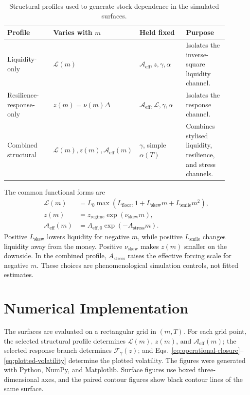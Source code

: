 \documentclass[11pt]{article}
\newcommand{\Aeff}{\mathcal A_{\mathrm{eff}}}
\newcommand{\Liq}{\mathcal L}
\newcommand{\Fresp}{\mathcal F}
\begin{document}
\begin{table}[ht]
\centering
\small
\caption{Structural profiles used to generate stock dependence in the simulated surfaces.}
\label{tab:profile-definitions}
\begin{tabular}{p{0.22\linewidth}p{0.26\linewidth}p{0.22\linewidth}p{0.20\linewidth}}
\toprule
Profile & Varies with \(m\) & Held fixed & Purpose \\
\midrule
Liquidity-only & \(\Liq(m)\) &
\(\Aeff,z,\gamma,\alpha\) &
Isolates the inverse-square liquidity channel. \\
Resilience-response-only & \(z(m)=\nu(m)\Delta\) &
\(\Aeff,\Liq,\gamma,\alpha\) &
Isolates the response channel. \\
Combined structural & \(\Liq(m),z(m),\Aeff(m)\) &
\(\gamma\), simple \(\alpha(T)\) &
Combines stylised liquidity, resilience, and stress channels. \\
\bottomrule
\end{tabular}
\end{table}

The common functional forms are
\begin{align}
 \Liq(m)
 &=
 L_0\max\!\left(L_{\mathrm{floor}},
 1+L_{\mathrm{skew}}m+L_{\mathrm{smile}}m^2\right),
 \label{eq:liquidity-profile}\\
 z(m)
 &=
 z_{\mathrm{regime}}\exp(\nu_{\mathrm{skew}}m),
 \label{eq:z-profile}\\
 \Aeff(m)
 &=
 A_{\mathrm{eff},0}\exp(-A_{\mathrm{stress}}m).
 \label{eq:forcing-profile}
\end{align}
Positive \(L_{\mathrm{skew}}\) lowers liquidity for negative \(m\), while
positive \(L_{\mathrm{smile}}\) changes liquidity away from the money.
Positive \(\nu_{\mathrm{skew}}\) makes \(z(m)\) smaller on the downside.
In the combined profile, \(A_{\mathrm{stress}}\) raises the effective forcing
scale for negative \(m\). These choices are phenomenological simulation
controls, not fitted estimates.

\section{Numerical Implementation}

The surfaces are evaluated on a rectangular grid in \((m,T)\). For each grid
point, the selected structural profile determines \(\Liq(m)\), \(z(m)\), and
\(\Aeff(m)\); the selected response branch determines \(\Fresp_\gamma(z)\);
and Eqs.~\eqref{eq:operational-closure}--\eqref{eq:plotted-volatility}
determine the plotted volatility. The figures were generated with Python,
NumPy, and Matplotlib. Surface figures use boxed three-dimensional axes, and
the paired contour figures show black contour lines of the same surface.
\end{document}
